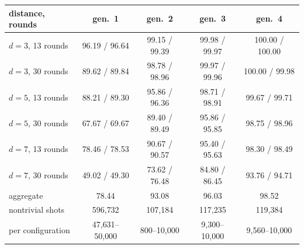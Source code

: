 \begin{tabular}{@{}lcccc@{}}
\toprule
distance, rounds & gen.~1 & gen.~2 & gen.~3 & gen.~4 \\
\midrule
$d=3$, 13 rounds & 96.19 / 96.64 & 99.15 / 99.39 & 99.98 / 99.97 & 100.00 / 100.00 \\
$d=3$, 30 rounds & 89.62 / 89.84 & 98.78 / 98.96 & 99.97 / 99.96 & 100.00 / 99.98 \\
$d=5$, 13 rounds & 88.21 / 89.30 & 95.86 / 96.36 & 98.71 / 98.91 & 99.67 / 99.71 \\
$d=5$, 30 rounds & 67.67 / 69.67 & 89.40 / 89.49 & 95.86 / 95.85 & 98.75 / 98.96 \\
$d=7$, 13 rounds & 78.46 / 78.53 & 90.67 / 90.57 & 95.40 / 95.63 & 98.30 / 98.49 \\
$d=7$, 30 rounds & 49.02 / 49.30 & 73.62 / 76.48 & 84.80 / 86.45 & 93.76 / 94.71 \\
\midrule
aggregate & 78.44 & 93.08 & 96.03 & 98.52 \\
nontrivial shots & 596{,}732 & 107{,}184 & 117{,}235 & 119{,}384 \\
per configuration & 47{,}631--50{,}000 & 800--10{,}000 & 9{,}300--10{,}000 & 9{,}560--10{,}000 \\
\bottomrule
\end{tabular}
